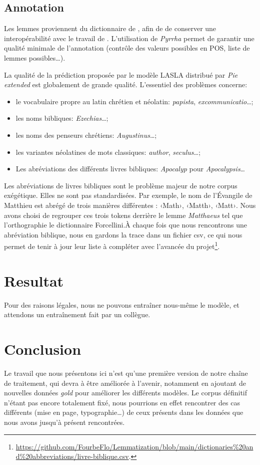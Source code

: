 \documentclass[11pt,french]{article}
\begin{document}
\subsection{Annotation}
Les lemmes proviennent du dictionnaire de \citet{forcellini1940}, afin de de conserver une interopérabilité avec le travail de \citep{cléri2022}. L'utilisation de \textit{Pyrrha} permet de garantir une qualité minimale de l'annotation (contrôle des valeurs possibles en POS, liste de lemmes possibles…). 

La qualité de la prédiction proposée par le modèle LASLA distribué par \textit{Pie extended} \citep{thibault_clerice_2020_3883590} est globalement de grande qualité. L'essentiel des problèmes concerne:
\begin{itemize}
\item le vocabulaire propre au latin chrétien et néolatin: \textit{papista}, \textit{excommunicatio}…;
\item les noms bibliques: \textit{Ezechias}…; 
\item les noms des penseurs chrétiens: \textit{Augustinus}…; 
\item les variantes néolatines de mots classiques:  \textit{author}, \textit{seculus}…; 
\item Les abréviations des différents livres bibliques: \textit{Apocalyp} pour \textit{Apocalypsis}…
\end{itemize}
Les abréviations de livres bibliques sont le problème majeur de notre corpus exégétique. Elles ne sont pas standardisées. Par exemple, le nom de l'Évangile de Matthieu est abrégé de trois manières différentes : ‹Math›, ‹Matth›, ‹Matt›. Nous avons choisi de regrouper ces trois tokens derrière le lemme \textit{Matthaeus} tel que l'orthographie le dictionnaire Forcellini.À chaque fois que nous rencontrons une abréviation biblique, nous en gardons la trace dans un fichier csv, ce qui nous permet de tenir à jour leur liste à compléter avec l'avancée du projet\footnote{\url{https://github.com/FourbeFlo/Lemmatization/blob/main/dictionaries\%20and\%20abbreviations/livre-biblique.csv}.}.

\section{Resultat}

Pour des raisons légales,  nous ne pouvons entraîner nous-même le modèle, et attendons un entraînement fait par un collègue.

\section{Conclusion}
Le travail que nous présentons ici n'est qu'une première version de notre chaîne de traitement, qui devra à être améliorée à l'avenir, notamment en ajoutant de nouvelles données \textit{gold} pour améliorer les différents modèles. Le corpus définitif n'étant pas encore totalement fixé, nous pourrions en effet rencontrer des cas différents (mise en page, typographie…) de ceux présents dans les données que nous avons jusqu'à présent rencontrées.
\end{document}
